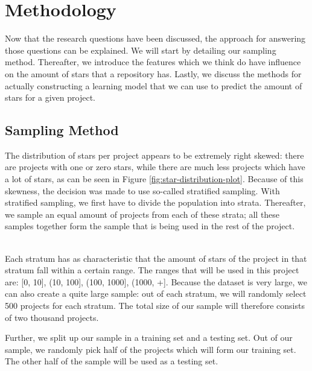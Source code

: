\section{Methodology}
    Now that the research questions have been discussed, the approach for answering those questions can be explained.
    We will start by detailing our sampling method. 
    Thereafter, we introduce the features which we think do have influence on the amount of stars that a repository has.
    Lastly, we discuss the methods for actually constructing a learning model that we can use to predict the amount of stars for a given project.
    \subsection{Sampling Method}
        The distribution of stars per project appears to be extremely right skewed: there are projects with one or zero stars, while there are much less projects which have a lot of stars, as can be seen in Figure \ref{fig:star-distribution-plot}.
        Because of this skewness, the decision was made to use so-called stratified sampling.
        With stratified sampling, we first have to divide the population into strata. 
        Thereafter, we sample an equal amount of projects from each of these strata; 
        all these samples together form the sample that is being used in the rest of the project.
        
         \\
        Each stratum has as characteristic that the amount of stars of the project in that stratum fall within a certain range. 
        The ranges that will be used in this project are: [0, 10], (10, 100], (100, 1000], (1000, +].
        Because the dataset is very large, we can also create a quite large sample:         
        out of each stratum, we will randomly select 500 projects for each stratum. The total size of our sample will therefore consists of two thousand projects.
        
        Further, we split up our sample in a training set and a testing set. Out of our sample, we randomly pick half of the projects which will form our training set. The other half of the sample will be used as a testing set.
        
